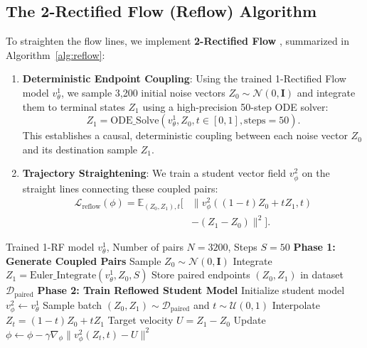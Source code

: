 \documentclass[conference]{IEEEtran}
\begin{document}
\subsection{The 2-Rectified Flow (Reflow) Algorithm}
To straighten the flow lines, we implement \textbf{2-Rectified Flow} \cite{liu2022flow}, summarized in Algorithm~\ref{alg:reflow}:
\begin{enumerate}
    \item \textbf{Deterministic Endpoint Coupling}: Using the trained 1-Rectified Flow model $v^1_\theta$, we sample 3,200 initial noise vectors $Z_0 \sim \mathcal{N}(0, \mathbf{I})$ and integrate them to terminal states $Z_1$ using a high-precision 50-step ODE solver:
    \begin{equation}
    Z_1 = \text{ODE\_Solve}\left(v^1_\theta, Z_0, t \in [0, 1], \text{steps}=50\right).
    \end{equation}
    This establishes a causal, deterministic coupling between each noise vector $Z_0$ and its destination sample $Z_1$.
    \item \textbf{Trajectory Straightening}: We train a student vector field $v^2_\phi$ on the straight lines connecting these coupled pairs:
    \begin{equation}
    \begin{aligned}
    \mathcal{L}_{\text{reflow}}(\phi) = \mathbb{E}_{(Z_0, Z_1), t} [&\| v^2_\phi((1-t)Z_0 + t Z_1, t) \\
    &- (Z_1 - Z_0) \|^2].
    \end{aligned}
    \end{equation}
\end{enumerate}

\begin{algorithm}[t]
\caption{2-Rectified Flow (Reflow) Trajectory Straightening}
\label{alg:reflow}
\begin{algorithmic}[1]
\REQUIRE Trained 1-RF model $v^1_\theta$, Number of pairs $N=3200$, Steps $S=50$
\STATE \textbf{Phase 1: Generate Coupled Pairs}
    \STATE Sample $Z_0 \sim \mathcal{N}(0, \mathbf{I})$
    \STATE Integrate $Z_1 = \text{Euler\_Integrate}(v^1_\theta, Z_0, S)$
    \STATE Store paired endpoints $(Z_0, Z_1)$ in dataset $\mathcal{D}_{\text{paired}}$
\ENDFOR
\STATE \textbf{Phase 2: Train Reflowed Student Model}
\STATE Initialize student model $v^2_\phi \leftarrow v^1_\theta$
\REPEAT
    \STATE Sample batch $(Z_0, Z_1) \sim \mathcal{D}_{\text{paired}}$ and $t \sim \mathcal{U}(0, 1)$
    \STATE Interpolate $Z_t = (1 - t) Z_0 + t Z_1$
    \STATE Target velocity $U = Z_1 - Z_0$
    \STATE Update $\phi \leftarrow \phi - \gamma \nabla_\phi \| v^2_\phi(Z_t, t) - U \|^2$
\end{algorithmic}
\end{algorithm}
\end{document}
